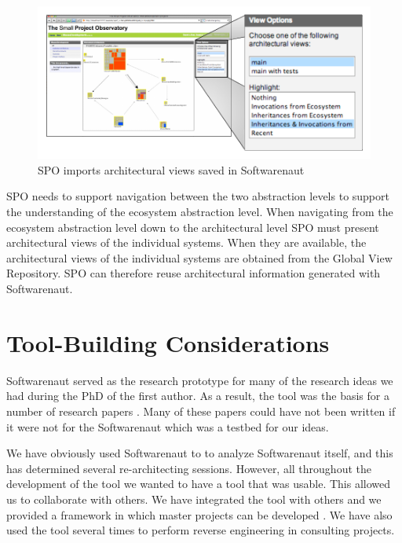 \documentclass[preprint,12pt]{elsarticle}
\begin{document}
\begin{figure}[ht]
\begin{center}
\includegraphics[width=\linewidth]{SpoArchitectural}
\caption{SPO imports architectural views saved in Softwarenaut}
\label{}
\end{center}
\end{figure}


SPO needs to support navigation between the two abstraction levels to support the understanding of  the ecosystem abstraction level. When navigating from the ecosystem abstraction level down to the architectural level SPO must present architectural views of the individual systems. When they are available, the architectural views of the individual systems are obtained from the Global View Repository. SPO can therefore reuse architectural information generated with Softwarenaut.



\section {Tool-Building Considerations}
\label {sec:disc}

Softwarenaut served as the research prototype for many of the research ideas we had during the PhD of the first author. As a result, the tool was the basis for a number of research papers \cite{lungu-cutedge, lungu-clust, lungu-packages, lungu-relevo}. Many of these papers could have not been written if it were not for the Softwarenaut which was a testbed for our ideas. 

We have obviously used Softwarenaut to to analyze Softwarenaut itself, and this has determined several re-architecting sessions. However, all throughout the development of the tool we wanted to have a tool that was usable. This allowed us to collaborate with others. We have integrated the tool with others \cite{lungu-clust, lungu-scico, nier-story} and we provided a framework in which master projects can be developed \cite{boeckmann-mars}. We have also used the tool several times to perform reverse engineering in consulting projects.
\end{document}
